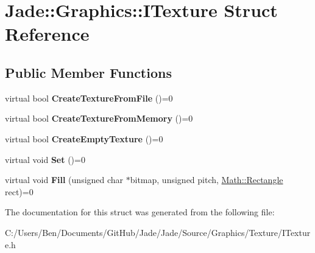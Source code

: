 \hypertarget{struct_jade_1_1_graphics_1_1_i_texture}{}\section{Jade\+:\+:Graphics\+:\+:I\+Texture Struct Reference}
\label{struct_jade_1_1_graphics_1_1_i_texture}
\subsection*{Public Member Functions}
\begin{DoxyCompactItemize}
\item 
\hypertarget{struct_jade_1_1_graphics_1_1_i_texture_af55656b5b19dc7c930498cd657e5a71f}{}virtual bool {\bfseries Create\+Texture\+From\+File} ()=0\label{struct_jade_1_1_graphics_1_1_i_texture_af55656b5b19dc7c930498cd657e5a71f}

\item 
\hypertarget{struct_jade_1_1_graphics_1_1_i_texture_a5f13651306a080d172402bf3c3816467}{}virtual bool {\bfseries Create\+Texture\+From\+Memory} ()=0\label{struct_jade_1_1_graphics_1_1_i_texture_a5f13651306a080d172402bf3c3816467}

\item 
\hypertarget{struct_jade_1_1_graphics_1_1_i_texture_a992152fc2269acb611a871436868df91}{}virtual bool {\bfseries Create\+Empty\+Texture} ()=0\label{struct_jade_1_1_graphics_1_1_i_texture_a992152fc2269acb611a871436868df91}

\item 
\hypertarget{struct_jade_1_1_graphics_1_1_i_texture_a9b44aff1bc79db1e115fdb0afab3fe8d}{}virtual void {\bfseries Set} ()=0\label{struct_jade_1_1_graphics_1_1_i_texture_a9b44aff1bc79db1e115fdb0afab3fe8d}

\item 
\hypertarget{struct_jade_1_1_graphics_1_1_i_texture_af8672b9379ed2177beee68ed50e58f93}{}virtual void {\bfseries Fill} (unsigned char $\ast$bitmap, unsigned pitch, \hyperlink{class_jade_1_1_math_1_1_rectangle}{Math\+::\+Rectangle} rect)=0\label{struct_jade_1_1_graphics_1_1_i_texture_af8672b9379ed2177beee68ed50e58f93}

\end{DoxyCompactItemize}


The documentation for this struct was generated from the following file\+:\begin{DoxyCompactItemize}
\item 
C\+:/\+Users/\+Ben/\+Documents/\+Git\+Hub/\+Jade/\+Jade/\+Source/\+Graphics/\+Texture/I\+Texture.\+h\end{DoxyCompactItemize}
